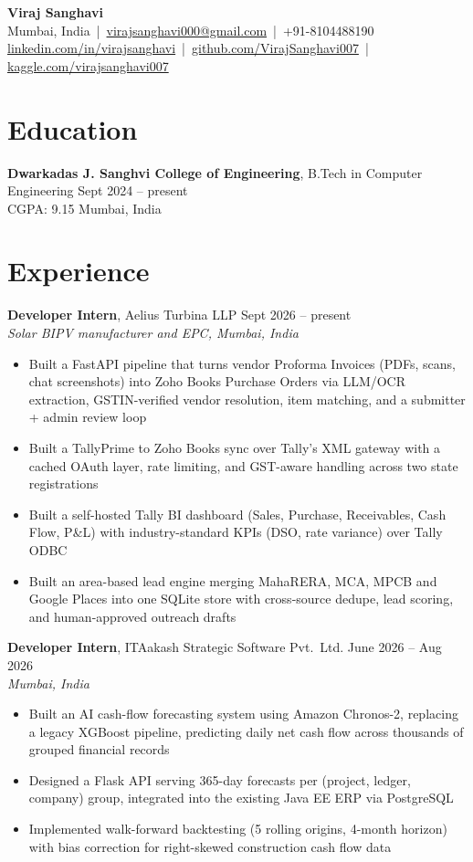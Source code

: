 \documentclass[10pt,letterpaper]{article}
\newcommand{\entry}[4]{\textbf{#1}, #2 \hfill #3\\{\small\textit{#4}}}
\begin{document}
\begin{center}
{\LARGE\bfseries Viraj Sanghavi}\\[4pt]
\small Mumbai, India \,|\, \href{mailto:virajsanghavi000@gmail.com}{virajsanghavi000@gmail.com} \,|\, +91-8104488190\\
\href{https://linkedin.com/in/virajsanghavi}{linkedin.com/in/virajsanghavi} \,|\,
\href{https://github.com/VirajSanghavi007}{github.com/VirajSanghavi007} \,|\,
\href{https://kaggle.com/virajsanghavi007}{kaggle.com/virajsanghavi007}
\end{center}

\section{Education}
\textbf{Dwarkadas J. Sanghvi College of Engineering}, B.Tech in Computer Engineering \hfill Sept 2024 -- present\\
CGPA: 9.15 \hfill Mumbai, India

\section{Experience}
\entry{Developer Intern}{Aelius Turbina LLP}{Sept 2026 -- present}{Solar BIPV manufacturer and EPC, Mumbai, India}
\begin{itemize}
  \item Built a FastAPI pipeline that turns vendor Proforma Invoices (PDFs, scans, chat screenshots) into Zoho Books Purchase Orders via LLM/OCR extraction, GSTIN-verified vendor resolution, item matching, and a submitter + admin review loop
  \item Built a TallyPrime to Zoho Books sync over Tally's XML gateway with a cached OAuth layer, rate limiting, and GST-aware handling across two state registrations
  \item Built a self-hosted Tally BI dashboard (Sales, Purchase, Receivables, Cash Flow, P\&L) with industry-standard KPIs (DSO, rate variance) over Tally ODBC
  \item Built an area-based lead engine merging MahaRERA, MCA, MPCB and Google Places into one SQLite store with cross-source dedupe, lead scoring, and human-approved outreach drafts
\end{itemize}
\vspace{1pt}
\entry{Developer Intern}{ITAakash Strategic Software Pvt.\ Ltd.}{June 2026 -- Aug 2026}{Mumbai, India}
\begin{itemize}
  \item Built an AI cash-flow forecasting system using Amazon Chronos-2, replacing a legacy XGBoost pipeline, predicting daily net cash flow across thousands of grouped financial records
  \item Designed a Flask API serving 365-day forecasts per (project, ledger, company) group, integrated into the existing Java EE ERP via PostgreSQL
  \item Implemented walk-forward backtesting (5 rolling origins, 4-month horizon) with bias correction for right-skewed construction cash flow data
\end{itemize}
\end{document}
